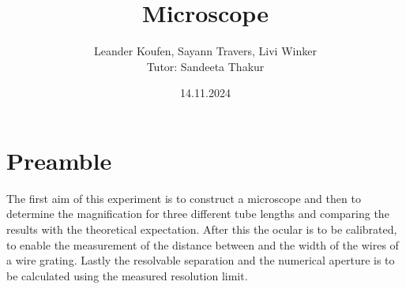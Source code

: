 \documentclass[fontsize=11pt, paper=a4, DIV=12]{scrartcl}
\title{Microscope}
\date{14.11.2024}
\author{Leander Koufen, Sayann Travers, Livi Winker\\
Tutor: Sandeeta Thakur}
\begin{document}
\maketitle

\tableofcontents
\clearpage

\section{Preamble}
The first aim of this experiment is to construct a microscope and then to determine the magnification for three different tube lengths
and comparing the results with the theoretical expectation. After this the ocular is to be calibrated, to enable the measurement of the
distance between and the width of the wires of a wire grating.
Lastly the resolvable separation and the numerical aperture is to be calculated using the measured resolution limit.

\newpage












\end{document}
